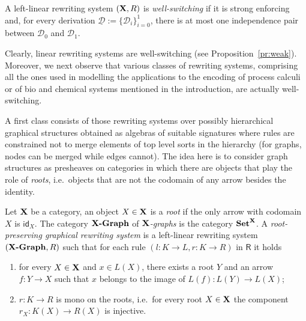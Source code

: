 \documentclass[a4paper,UKenglish,cleveref,pdftex,thm-restate,numberwithinsect]{lipics-v2021}
\newcommand{\gph}[1]{\textbf{\textup{{#1}-Graph}}}
\newcommand{\id}[1]{\mathsf{id}_{#1}}
\def\R{\mathsf{R}}
\def\X{\textbf {\textup{X}}}
\newcommand{\dder}[1]{\mathscr{#1}}
\newcommand{\der}[1]{\underline{\dder{#1}}}
\def\Set{\textbf {\textup{Set}}}
\begin{document}


\begin{definition}
A left-linear rewriting system $(\X, \R)$ is \emph{well-switching} if it is strong enforcing and, for every derivation $\der{D}:=\{\dder{D}_{i}\}_{i=0}^1$, there is at most one independence pair between $\dder{D}_0$ and $\dder{D}_1$.
\end{definition}

Clearly, %
linear rewriting systems are well-switching (see Proposition~\ref{pr:weak}).
%
Moreover, we next observe that various classes of rewriting systems,
comprising all the ones used in modelling the applications to the
encoding of process calculi or of bio and chemical systems mentioned
in the introduction, are actually well-switching.

A first class consists of those rewriting systems over
possibly hierarchical graphical structures obtained as algebras of
suitable signatures where rules are constrained not to merge elements
of top level sorts in the hierarchy (for graphs, nodes can be
merged while edges cannot). The idea here is to consider graph
structures as presheaves on categories in which there are objects that play 
the role of \emph{roots}, i.e.~objects that are not the codomain of 
any arrow besides the identity. 

\begin{definition}
	Let $\X$ be a category, an object $X\in \X$ is a \emph{root} if the only arrow with codomain $X$ is $\id{X}$.
	The category $\gph{X}$ of \emph{$\X$-graphs} is the category
	$\Set^{\X}$. A
	\emph{root-preserving graphical rewriting system} is a left-linear
	rewriting system $(\gph{X}, \R)$ such that for each rule
	$(l\colon K\to L, r\colon K\to R)$ in $\R$ it holds
	\begin{enumerate}
		\item for every $X\in \X$ and $x\in L(X)$, there exists a root $Y$
		 and an arrow $f\colon Y\to X$ such that $x$ belongs to the image of
		$L(f)\colon L(Y)\to L(X)$;
		\item $r\colon K\to R$ is mono on the roots, i.e.~for every root $X\in \X$ the component $r_X:K(X)\to R(X)$ is injective.
	\end{enumerate}
\end{definition}
\end{document}
